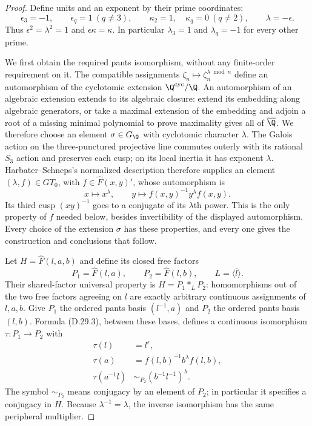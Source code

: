 \begin{proof}
Define units and an exponent by their prime coordinates:
\[
 \epsilon_3=-1,\qquad\epsilon_q=1\ (q\ne3),\qquad
 \kappa_2=1,\quad\kappa_q=0\ (q\ne2),\qquad
 \lambda=-\epsilon.
                                                        \tag{D.29.2}
\]
Thus $\epsilon^2=\lambda^2=1$ and
$\epsilon\kappa=\kappa$.  In particular $\lambda_3=1$
and $\lambda_q=-1$ for every other prime.

We first obtain the required pants isomorphism, without any
finite-order requirement on it.  The compatible assignments
$\zeta_n\mapsto\zeta_n^{\lambda\bmod n}$ define an automorphism
of the cyclotomic extension $\Q^{\rm cyc}/\Q$.
An automorphism of an algebraic extension extends to its algebraic
closure: extend its embedding along algebraic generators, or take
a maximal extension of the embedding and adjoin a root of a missing
minimal polynomial to prove maximality gives all of
$\overline\Q$.  We therefore choose an element
$\sigma\in G_{\Q}$ with cyclotomic character $\lambda$.
The Galois action on the three-punctured projective line commutes
outerly with its rational $S_3$ action and preserves each cusp;
on its local inertia it has exponent $\lambda$.
Harbater--Schneps's normalized description
\cite[\S0.2, Main Theorem (a), Theorem A]{R-HS}
therefore supplies an element $(\lambda,f)\in GT_0$, with
$f\in\widehat F(x,y)'$, whose automorphism is
\[
 x\longmapsto x^\lambda,\qquad
 y\longmapsto f(x,y)^{-1}y^\lambda f(x,y).
                                                        \tag{D.29.3}
\]
Its third cusp $(xy)^{-1}$ goes to a conjugate of its
$\lambda$th power.  This is the only property of $f$ needed
below, besides invertibility of the displayed automorphism.
Every choice of the extension $\sigma$ has these properties,
and every one gives the construction and conclusions that follow.

Let $H=\widehat F(l,a,b)$ and define its closed free factors
\[
 P_1=\widehat F(l,a),\qquad P_2=\widehat F(l,b),\qquad
 L=\overline{\langle l\rangle}.
\]
Their shared-factor universal property is
$H=P_1\mathbin{*_{L}}P_2$: homomorphisms out of the two
free factors agreeing on $l$ are exactly arbitrary continuous
assignments of $l,a,b$.  Give $P_1$ the ordered pants basis
$(l^{-1},a)$ and $P_2$ the ordered pants basis $(l,b)$.
Formula (D.29.3), between these bases, defines a continuous
isomorphism $\tau:P_1\to P_2$ with
\[
 \begin{split}
 \tau(l)&=l^\epsilon,\\
 \tau(a)&=f(l,b)^{-1}b^\lambda f(l,b),\\
 \tau(a^{-1}l)&\sim_{P_2}(b^{-1}l^{-1})^\lambda.
 \end{split}                                           \tag{D.29.4}
\]
The symbol $\sim_{P_2}$ means conjugacy by an element of
$P_2$; in particular it specifies a conjugacy in $H$.
Because $\lambda^{-1}=\lambda$, the inverse isomorphism has
the same peripheral multiplier.


\end{proof}
